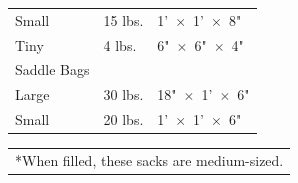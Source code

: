 \begin{multicols}{2}
\begin{minipage}{\columnwidth}
\begin{tabular}{|p{}|p{}|p{}|}
\hspace{1em}Small	& 15 lbs.	& 1'~$\times$~1'~$\times$~8" \\
\rowcolor[gray]{.9}\hspace{1em}Tiny	& 4 lbs.	& 6"~$\times$~6"~$\times$~4" \\
Saddle Bags	& 	& \\
\hspace{1em}Large	& 30 lbs.	& 18"~$\times$~1'~$\times$~6" \\
\rowcolor[gray]{.9}\hspace{1em}Small	& 20 lbs.	& 1'~$\times$~1'~$\times$~6" \\
\hline
\end{tabular}
\noindent\begin{tabular}{p{}}
*When filled, these sacks are medium-sized. \\
\end{tabular}\vspace{.5em}

\end{minipage}

\noindent
\begin{minipage}{\columnwidth}


\end{minipage}
\end{multicols}
